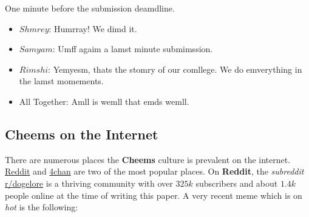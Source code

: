 \def\DevnagVersion{2.17}\documentclass{article}
\begin{document}
One minute before the submission deamdline.
\begin{itemize}[label={}]
    \item $Shmrey$: Humrray! We dimd it.
    \item $Samyam$: Umff agaim a lamst minute submimssion.
    \item $Rimshi$: Yemyesm, thats the stomry of our comllege. We do emverything in the lamst momements.
    \item All Together: Amll is wemll that emds wemll.
\end{itemize}

\subsection{Cheems on the Internet}
There are numerous places the \textbf{Cheems} culture is prevalent on the internet. \href{https://www.reddit.com}{Reddit} and \href{https://www.4chan.org}{4chan} are two of the most popular places. On \textbf{Reddit}, the \textit{subreddit} \href{https://www.reddit.com/r/dogelore}{r/dogelore} is a thriving community with over $325k$ subscribers and about $1.4k$ people online at the time of writing this paper. A very recent meme which is on \textit{hot} is the following:
\end{document}
